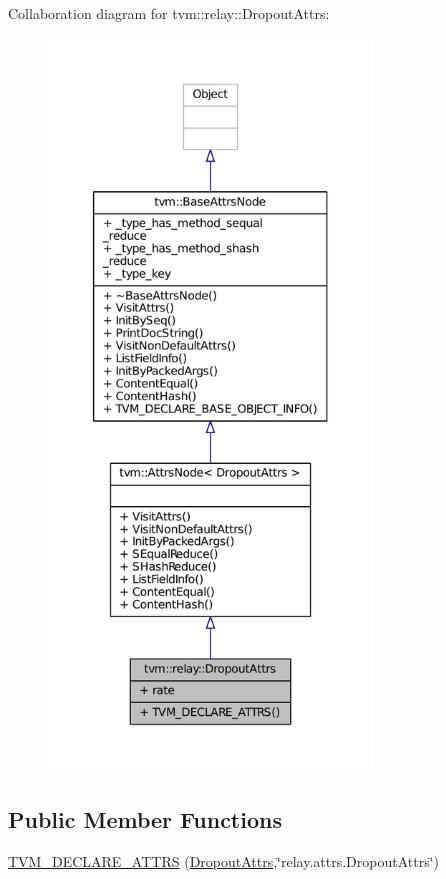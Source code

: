 Collaboration diagram for tvm\+:\+:relay\+:\+:Dropout\+Attrs\+:
\nopagebreak
\begin{figure}[H]
\begin{center}
\leavevmode
\includegraphics[height=550pt]{structtvm_1_1relay_1_1DropoutAttrs__coll__graph}
\end{center}
\end{figure}
\subsection*{Public Member Functions}
\begin{DoxyCompactItemize}
\item 
\hyperlink{structtvm_1_1relay_1_1DropoutAttrs_aa424a54017a8c42cc5b8226a8dfb65ac}{T\+V\+M\+\_\+\+D\+E\+C\+L\+A\+R\+E\+\_\+\+A\+T\+T\+RS} (\hyperlink{structtvm_1_1relay_1_1DropoutAttrs}{Dropout\+Attrs},\char`\"{}relay.\+attrs.\+Dropout\+Attrs\char`\"{})
\end{DoxyCompactItemize}
